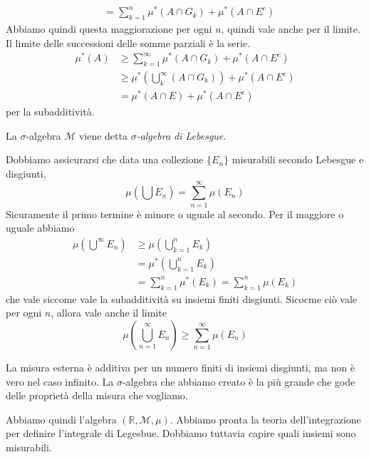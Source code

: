 \documentclass[a4paper]{article}
\begin{document}
{\begin{enumerate}
\begin{align*}
             &= \sum_{k=1}^n \mu^*\left(A \cap G_k\right)
             + \mu^*(A \cap E^c)
        \end{align*}
        Abbiamo quindi questa maggiorazione per ogni \(n\), quindi vale anche per il limite.
        Il limite delle successioni delle somme parziali è la serie.
        \begin{align*}
            \mu^*(A) &\geq \sum_{k=1}^\infty \mu^*(A \cap G_k) + \mu^*(A \cap E^c) \\
            &\geq \mu^*\left(\bigcup_k^\infty (A \cap G_k)\right)
            + \mu^*(A \cap E^c) \\
            &= \mu^*(A \cap E) + \mu^*(A \cap E^c)
        \end{align*}
        per la subadditività.
    \end{enumerate}
}

La \(\sigma\)-algebra \(\mathcal{M}\) viene detta \emph{\(\sigma\)-algebra di Lebesgue}.


Dobbiamo assicurarsi che data una collezione \(\{E_n\}\) misurabili secondo Lebesgue e disgiunti,
\[
    \mu\left(\bigcup E_n\right) = \sum_{n=1}^\infty \mu(E_n)
\]
Sicuramente il primo termine è minore o uguale al secondo.
Per il maggiore o uguale abbiamo
\begin{align*}
    \mu\left(\bigcup^\infty E_n\right) &\geq \mu\left(\bigcup_{k=1}^n E_k\right) \\
    &= \mu^*\left(\bigcup_{k=1}^n E_k\right) \\
    &= \sum_{k=1}^n \mu^*(E_k) = \sum_{k=1}^n \mu(E_k)
\end{align*}
che vale siccome vale la subadditività su insiemi finiti disgiunti.
Sicocme ciò vale per ogni \(n\), allora vale anche il limite
\[
    \mu\left(
        \bigcup_{n=1}^\infty E_n
    \right)
     \geq \sum_{n=1}^\infty \mu(E_n)
\]

La misura esterna è additiva per un numero finiti di insiemi disgiunti, ma non è vero nel caso infinito.
La \(\sigma\)-algebra che abbiamo creato è la più grande che gode delle proprietà della misura che vogliamo.

Abbiamo quindi l'algebra \((\mathbb{R}, \mathcal{M}, \mu)\). Abbiamo pronta la teoria dell'integrazione
per definire l'integrale di Legesbue. Dobbiamo tuttavia capire quali insiemi sono misurabili.
\end{document}
